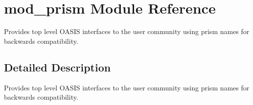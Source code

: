 \hypertarget{namespacemod__prism}{}\section{mod\+\_\+prism Module Reference}
\label{namespacemod__prism}


Provides top level O\+A\+S\+IS interfaces to the user community using prism names for backwards compatibility.  




\subsection{Detailed Description}
Provides top level O\+A\+S\+IS interfaces to the user community using prism names for backwards compatibility. 
